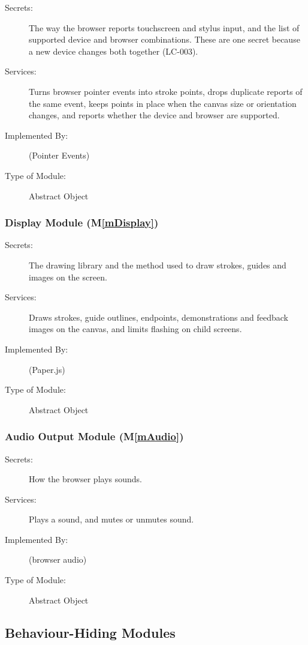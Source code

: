 \documentclass[12pt, titlepage]{article}
\newcommand{\mref}[1]{M\ref{#1}}
\begin{document}
\begin{description}
\item[Secrets:] The way the browser reports touchscreen and stylus input, and
  the list of supported device and browser combinations. These are one secret
  because a new device changes both together (LC-003).
\item[Services:] Turns browser pointer events into stroke points, drops
  duplicate reports of the same event, keeps points in place when the canvas
  size or orientation changes, and reports whether the device and browser are
  supported.
\item[Implemented By:] \progname{} (Pointer Events)
\item[Type of Module:] Abstract Object
\end{description}

\subsubsection{Display Module (\mref{mDisplay})}

\begin{description}
\item[Secrets:] The drawing library and the method used to draw strokes, guides
  and images on the screen.
\item[Services:] Draws strokes, guide outlines, endpoints, demonstrations and
  feedback images on the canvas, and limits flashing on child screens.
\item[Implemented By:] \progname{} (Paper.js)
\item[Type of Module:] Abstract Object
\end{description}

\subsubsection{Audio Output Module (\mref{mAudio})}

\begin{description}
\item[Secrets:] How the browser plays sounds.
\item[Services:] Plays a sound, and mutes or unmutes sound.
\item[Implemented By:] \progname{} (browser audio)
\item[Type of Module:] Abstract Object
\end{description}

\subsection{Behaviour-Hiding Modules}
\end{document}
